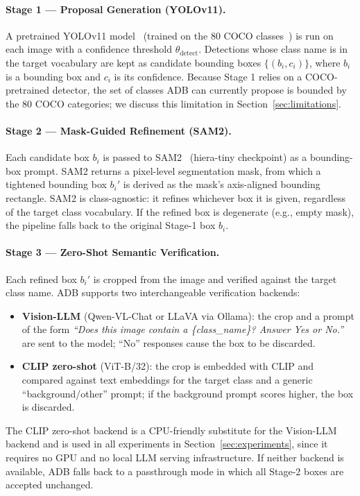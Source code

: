 \documentclass[11pt]{article}
\begin{document}
\paragraph{Stage 1 --- Proposal Generation (YOLOv11).} A pretrained
YOLOv11 model~\citep{jocher2024yolo11} (trained on the 80 COCO
classes~\citep{lin2014microsoft}) is run on each image with a confidence
threshold $\theta_{\text{detect}}$. Detections whose class name is in the
target vocabulary are kept as candidate bounding boxes
$\{(b_i, c_i)\}$, where $b_i$ is a bounding box and $c_i$ is its confidence.
Because Stage 1 relies on a COCO-pretrained detector, the set of classes ADB
can currently propose is bounded by the 80 COCO categories; we discuss this
limitation in Section~\ref{sec:limitations}.

\paragraph{Stage 2 --- Mask-Guided Refinement (SAM2).} Each candidate box
$b_i$ is passed to SAM2~\citep{ravi2024sam2} (hiera-tiny checkpoint) as a
bounding-box prompt. SAM2 returns a pixel-level segmentation mask, from which
a tightened bounding box $b_i'$ is derived as the mask's axis-aligned
bounding rectangle. SAM2 is class-agnostic: it refines whichever box it is
given, regardless of the target class vocabulary. If the refined box is
degenerate (e.g., empty mask), the pipeline falls back to the original
Stage-1 box $b_i$.

\paragraph{Stage 3 --- Zero-Shot Semantic Verification.} Each refined box
$b_i'$ is cropped from the image and verified against the target class name.
ADB supports two interchangeable verification backends:
\begin{itemize}
\item \textbf{Vision-LLM} (Qwen-VL-Chat or LLaVA via Ollama): the crop and a
  prompt of the form \emph{``Does this image contain a \{class\_name\}?
  Answer Yes or No.''} are sent to the model; ``No'' responses cause the box
  to be discarded.
\item \textbf{CLIP zero-shot} (ViT-B/32): the crop is embedded with CLIP and
  compared against text embeddings for the target class and a generic
  ``background/other'' prompt; if the background prompt scores higher, the
  box is discarded.
\end{itemize}
The CLIP zero-shot backend is a CPU-friendly substitute for the Vision-LLM
backend and is used in all experiments in Section~\ref{sec:experiments},
since it requires no GPU and no local LLM serving infrastructure. If neither
backend is available, ADB falls back to a passthrough mode in which all
Stage-2 boxes are accepted unchanged.
\end{document}
